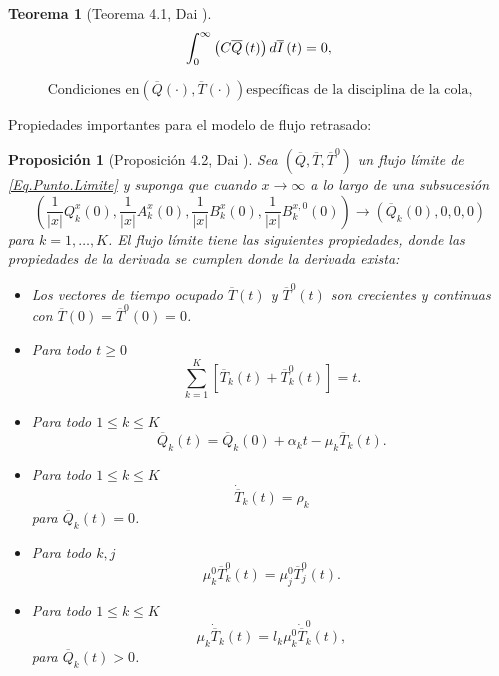 \documentclass{article}
\newtheorem{Teo}{Teorema}
\newtheorem{Prop}{Proposición}
\begin{document}
\begin{Teo}[Teorema 4.1, Dai \cite{Dai}]
\begin{equation}\label{Eq.MF.5.3a}
\int_{0}^{\infty}\left(C\overline{Q}\left(t\right)\right)d\overline{I}\left(t\right)=0,\\
\end{equation}

\begin{equation}\label{Eq.MF.6.3a}
\textrm{Condiciones en
}\left(\overline{Q}\left(\cdot\right),\overline{T}\left(\cdot\right)\right)\textrm{
espec\'ificas de la disciplina de la cola,}
\end{equation}
\end{Teo}


Propiedades importantes para el modelo de flujo retrasado:

\begin{Prop}[Proposici\'on 4.2, Dai \cite{Dai}]
 Sea $\left(\overline{Q},\overline{T},\overline{T}^{0}\right)$ un flujo l\'imite de \ref{Eq.Punto.Limite}
 y suponga que cuando $x\rightarrow\infty$ a lo largo de una subsucesi\'on
\[\left(\frac{1}{|x|}Q_{k}^{x}\left(0\right),\frac{1}{|x|}A_{k}^{x}\left(0\right),\frac{1}{|x|}B_{k}^{x}\left(0\right),\frac{1}{|x|}B_{k}^{x,0}\left(0\right)\right)\rightarrow\left(\overline{Q}_{k}\left(0\right),0,0,0\right)\]
para $k=1,\ldots,K$. El flujo l\'imite tiene las siguientes
propiedades, donde las propiedades de la derivada se cumplen donde
la derivada exista:
\begin{itemize}
 \item[i)] Los vectores de tiempo ocupado $\overline{T}\left(t\right)$ y $\overline{T}^{0}\left(t\right)$ son crecientes y continuas con
$\overline{T}\left(0\right)=\overline{T}^{0}\left(0\right)=0$.
\item[ii)] Para todo $t\geq0$
\[\sum_{k=1}^{K}\left[\overline{T}_{k}\left(t\right)+\overline{T}_{k}^{0}\left(t\right)\right]=t.\]
\item[iii)] Para todo $1\leq k\leq K$
\[\overline{Q}_{k}\left(t\right)=\overline{Q}_{k}\left(0\right)+\alpha_{k}t-\mu_{k}\overline{T}_{k}\left(t\right).\]
\item[iv)]  Para todo $1\leq k\leq K$
\[\dot{{\overline{T}}}_{k}\left(t\right)=\rho_{k}\] para $\overline{Q}_{k}\left(t\right)=0$.
\item[v)] Para todo $k,j$
\[\mu_{k}^{0}\overline{T}_{k}^{0}\left(t\right)=\mu_{j}^{0}\overline{T}_{j}^{0}\left(t\right).\]
\item[vi)]  Para todo $1\leq k\leq K$
\[\mu_{k}\dot{{\overline{T}}}_{k}\left(t\right)=l_{k}\mu_{k}^{0}\dot{{\overline{T}}}_{k}^{0}\left(t\right),\] para $\overline{Q}_{k}\left(t\right)>0$.
\end{itemize}
\end{Prop}
\end{document}
